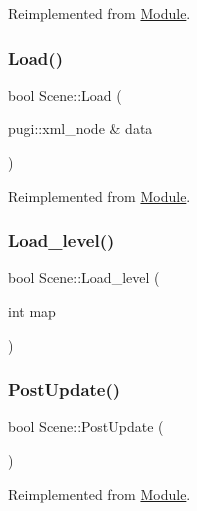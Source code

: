 Reimplemented from \mbox{\hyperlink{class_module_a77d7a006e42c0bd10110e1adbd4598cb}{Module}}.

\mbox{\label{class_scene_aabbd7af9c75ded5b555170426259699e}} 
\subsubsection{\texorpdfstring{Load()}{Load()}}
{\footnotesize\ttfamily bool Scene\+::\+Load (\begin{DoxyParamCaption}\item[{pugi\+::xml\+\_\+node \&}]{data }\end{DoxyParamCaption})\hspace{0.3cm}{\ttfamily [virtual]}}



Reimplemented from \mbox{\hyperlink{class_module_adf4ae9320f5f244c47b472348fb3c1f9}{Module}}.

\mbox{\label{class_scene_ab4d0bc4653b2d48a8e7f403d29a8946f}} 
\subsubsection{\texorpdfstring{Load\_level()}{Load\_level()}}
{\footnotesize\ttfamily bool Scene\+::\+Load\+\_\+level (\begin{DoxyParamCaption}\item[{int}]{map }\end{DoxyParamCaption})}

\mbox{\label{class_scene_a0e0ffba2fc23c7cb61242e99e59e4c68}} 
\subsubsection{\texorpdfstring{PostUpdate()}{PostUpdate()}}
{\footnotesize\ttfamily bool Scene\+::\+Post\+Update (\begin{DoxyParamCaption}{ }\end{DoxyParamCaption})\hspace{0.3cm}{\ttfamily [virtual]}}



Reimplemented from \mbox{\hyperlink{class_module_afc355df351a4483850c3f512823ceebd}{Module}}.

